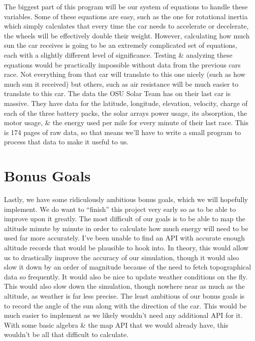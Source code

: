 \documentclass[onecolumn, draftclsnofoot,10pt, compsoc]{IEEEtran}
\begin{document}
\begin{singlespace}
The biggest part of this program will be our system of equations to handle these variables. Some of these equations are easy, such as the one for rotational inertia which simply calculates that every time the car needs to accelerate or decelerate, the wheels will be effectively double their weight. However, calculating how much sun the car receives is going to be an extremely complicated set of equations, each with a slightly different level of significance. Testing \& analyzing these equations would be practically impossible without data from the previous cars race. Not everything from that car will translate to this one nicely (such as how much sun it received) but others, such as air resistance will be much easier to translate to this car. The data the OSU Solar Team has on their last car is massive. They have data for the latitude, longitude, elevation, velocity, charge of each of the three battery packs, the solar arrays power usage, its absorption, the motor usage, \& the energy used per mile for every minute of their last race. This is 174 pages of raw data, so that means we’ll have to write a small program to process that data to make it useful to us.

\section{Bonus Goals}

Lastly, we have some ridiculously ambitious bonus goals, which we will hopefully implement. We do want to “finish” this project very early so as to be able to improve upon it greatly. The most difficult of our goals is to be able to map the altitude minute by minute in order to calculate how much energy will need to be used far more accurately. I’ve been unable to find an API with accurate enough altitude records that would be plausible to hook into. In theory, this would allow us to drastically improve the accuracy of our simulation, though it would also slow it down by an order of magnitude because of the need to fetch topographical data so frequently. It would also be nice to update weather conditions on the fly. This would also slow down the simulation, though nowhere near as much as the altitude, as weather is far less precise. The least ambitious of our bonus goals is to record the angle of the sun along with the direction of the car. This would be much easier to implement as we likely wouldn’t need any additional API for it. With some basic algebra \& the map API that we would already have, this wouldn’t be all that difficult to calculate.

    \end{singlespace}
\end{document}
